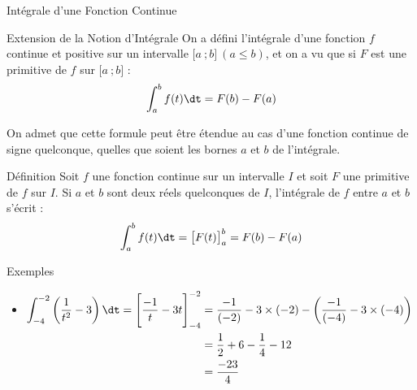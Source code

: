 \documentclass{cours}
\begin{document}
    \begin{Gpartie}{Intégrale d'une Fonction Continue} 
        \begin{Spartie}{Extension de la Notion d'Intégrale} 
            On a défini l'intégrale d'une fonction $f$ continue et positive sur un intervalle $\big[a~;b\big]~\left(a\leq b\right)$, et on a vu que si $F$ est une primitive de $f$ sur $\big[a~;b\big]$ : \[\int_a^b f(t)\dt=F(b)-F(a)\]

            On admet que cette formule peut être étendue au cas d'une fonction continue de signe quelconque, quelles que soient les bornes $a$ et $b$ de l'intégrale.

            \begin{SSpartie}{Définition} 
                Soit $f$ une fonction continue sur un intervalle $I$ et soit $F$ une primitive de $f$ sur $I$. Si $a$ et $b$ sont deux réels quelconques de $I$, l'intégrale de $f$ entre $a$ et $b$ s'écrit : \[\int_a^b f(t)\dt=\big[F(t)\big]_a^b=F(b)-F(a)\]
            \end{SSpartie}
            \begin{SSpartie}{Exemples} 
                \begin{itemize}
                    \item   
                    $\begin{aligned}[t]
                        \int_{-4}^{-2}\left(\frac{1}{t^2}-3\right)\dt=\Bigg[\frac{-1}{t}-3t\Bigg]_{-4}^{-2}&=\frac{-1}{(-2)}-3\times(-2)-\left(\frac{-1}{(-4)}-3\times(-4)\right)  \\
                        &=\frac{1}{2}+6-\frac{1}{4}-12 \\
                        &=\frac{-23}{4}
                    \end{aligned}$


\end{itemize}
\end{SSpartie}
\end{Spartie}
\end{Gpartie}
\end{document}
